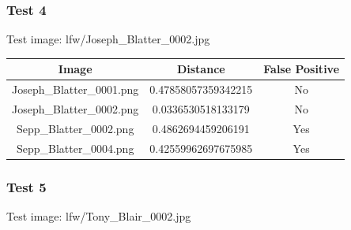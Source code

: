 \documentclass[12pt]{article}
\begin{document}
\subsubsection{Test 4}
Test image: lfw/Joseph\_Blatter\_0002.jpg

\begin{center}
\begin{tabular}{ccc}
Image & Distance & False Positive \\
\hline
Joseph\_Blatter\_0001.png & 0.47858057359342215 & No \\
Joseph\_Blatter\_0002.png & 0.0336530518133179 & No \\
Sepp\_Blatter\_0002.png & 0.4862694459206191 & Yes \\
Sepp\_Blatter\_0004.png & 0.42559962697675985 & Yes \\

\end{tabular}
\end{center}

\subsubsection{Test 5}
Test image: lfw/Tony\_Blair\_0002.jpg
\end{document}
